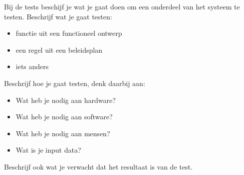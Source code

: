 Bij de tests beschijf je wat je gaat doen om een onderdeel van het systeem te testen. Beschrijf wat je gaat testen:
\begin{itemize}
\item functie uit een functioneel ontwerp
\item een regel uit een beleidsplan
\item iets anders
\end{itemize}

Beschrijf hoe je gaat testen, denk daarbij aan:
\begin{itemize}
\item Wat heb je nodig aan hardware?
\item Wat heb je nodig aan software?
\item Wat heb je nodig aan mensen?
\item Wat is je input data?
\end{itemize}

Beschrijf ook wat je verwacht dat het resultaat is van de test.
